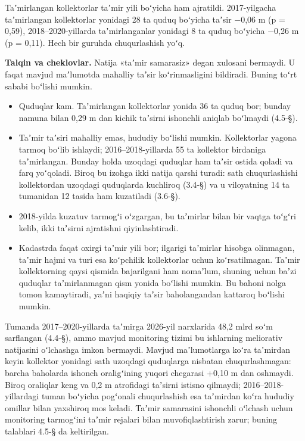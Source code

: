 

Taʼmirlangan kollektorlar taʼmir yili boʻyicha ham ajratildi.
2017-yilgacha taʼmirlangan kollektorlar yonidagi 28 ta quduq boʻyicha
taʼsir −0,06 m (p = 0,59), 2018--2020-yillarda taʼmirlanganlar yonidagi
8 ta quduq boʻyicha −0,26 m (p = 0,11). Hech bir guruhda chuqurlashish
yoʻq.

\textbf{Talqin va cheklovlar.} Natija «taʼmir samarasiz» degan xulosani
bermaydi. U faqat mavjud maʼlumotda mahalliy taʼsir koʻrinmasligini
bildiradi. Buning toʻrt sababi boʻlishi mumkin.

\begin{itemize}
\tightlist
\item
  Quduqlar kam. Taʼmirlangan kollektorlar yonida 36 ta quduq bor; bunday
  namuna bilan 0,29 m dan kichik taʼsirni ishonchli aniqlab boʻlmaydi
  (4.5-§).
\item
  Taʼmir taʼsiri mahalliy emas, hududiy boʻlishi mumkin. Kollektorlar
  yagona tarmoq boʻlib ishlaydi; 2016--2018-yillarda 55 ta kollektor
  birdaniga taʼmirlangan. Bunday holda uzoqdagi quduqlar ham taʼsir
  ostida qoladi va farq yoʻqoladi. Biroq bu izohga ikki natija qarshi
  turadi: sath chuqurlashishi kollektordan uzoqdagi quduqlarda kuchliroq
  (3.4-§) va u viloyatning 14 ta tumanidan 12 tasida ham kuzatiladi
  (3.6-§).
\item
  2018-yilda kuzatuv tarmogʻi oʻzgargan, bu taʼmirlar bilan bir vaqtga
  toʻgʻri kelib, ikki taʼsirni ajratishni qiyinlashtiradi.
\item
  Kadastrda faqat oxirgi taʼmir yili bor; ilgarigi taʼmirlar hisobga
  olinmagan, taʼmir hajmi va turi esa koʻpchilik kollektorlar uchun
  koʻrsatilmagan. Taʼmir kollektorning qaysi qismida bajarilgani ham
  nomaʼlum, shuning uchun baʼzi quduqlar taʼmirlanmagan qism yonida
  boʻlishi mumkin. Bu bahoni nolga tomon kamaytiradi, yaʼni haqiqiy
  taʼsir baholangandan kattaroq boʻlishi mumkin.
\end{itemize}

Tumanda 2017--2020-yillarda taʼmirga 2026-yil narxlarida 48,2 mlrd soʻm
sarflangan (4.4-§), ammo mavjud monitoring tizimi bu ishlarning
meliorativ natijasini oʻlchashga imkon bermaydi. Mavjud maʼlumotlarga
koʻra taʼmirdan keyin kollektor yonidagi sath uzoqdagi quduqlarga
nisbatan chuqurlashmagan: barcha baholarda ishonch oraligʻining yuqori
chegarasi +0,10 m dan oshmaydi. Biroq oraliqlar keng va 0,2 m atrofidagi
taʼsirni istisno qilmaydi; 2016--2018-yillardagi tuman boʻyicha
pogʻonali chuqurlashish esa taʼmirdan koʻra hududiy omillar bilan
yaxshiroq mos keladi. Taʼmir samarasini ishonchli oʻlchash uchun
monitoring tarmogʻini taʼmir rejalari bilan muvofiqlashtirish zarur;
buning talablari 4.5-§ da keltirilgan.

